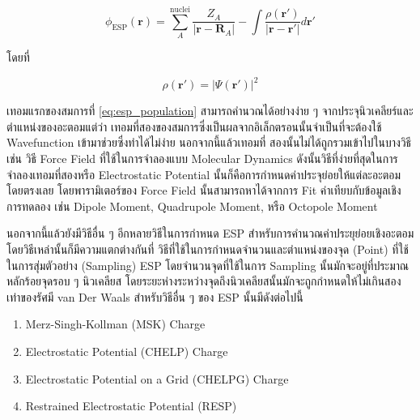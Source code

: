 \begin{enumerate}[topsep=0pt,noitemsep]
          \begin{equation}\label{eq:esp_population}
              \phi_{\text{ESP}}(\bm{r}) = \sum^{\text{nuclei}}_{A} \frac{Z_{A}}{|\bm{r} - \bm{R}_{A}|}
              - \int \frac{\rho(\bm{r}')}{|\bm{r} - \bm{r}'|} d\bm{r}'
          \end{equation}

          \noindent โดยที่

          \begin{equation}
              \rho(\bm{r}') = |\Psi(\bm{r}')|^{2}
          \end{equation}

          เทอมแรกของสมการที่ \eqref{eq:esp_population} สามารถคำนวณได้อย่างง่าย ๆ จากประจุนิวเคลียร์และตำแหน่งของอะตอมแต่ว่า%
          เทอมที่สองของสมการซึ่งเป็นผลจากอิเล็กตรอนนั้นจำเป็นที่จะต้องใช้ Wavefunction เข้ามาช่วยซึ่งทำได้ไม่ง่าย นอกจากนี้แล้วเทอมที่%
          สองนั้นไม่ได้ถูกรวมเข้าไปในบางวิธี เช่น วิธี Force Field ที่ใช้ในการจำลองแบบ Molecular Dynamics ดังนั้นวิธีที่ง่ายที่สุดในการ%
          จำลองเทอมที่สองหรือ Electrostatic Potential นั้นก็คือการกำหนดค่าประจุย่อยให้แต่ละอะตอมโดยตรงเลย โดยพารามิเตอร์ของ
          Force Field นั้นสามารถหาได้จากการ Fit ค่าเทียบกับข้อมูลเชิงการทดลอง เช่น Dipole Moment, Quadrupole Moment,
          หรือ Octopole Moment

          นอกจากนี้แล้วยังมีวิธีอื่น ๆ อีกหลายวิธีในการกำหนด ESP สำหรับการคำนวณค่าประยุย่อยเชิงอะตอม โดยวิธีเหล่านั้นก็มีความแตกต่างกันที่%
          วิธีที่ใช้ในการกำหนดจำนวนและตำแหน่งของจุด (Point) ที่ใช้ในการสุ่มตัวอย่าง (Sampling) ESP โดยจำนวนจุดที่ใช้ในการ Sampling
          นั้นมักจะอยู่ที่ประมาณหลักร้อยจุดรอบ ๆ นิวเคลียส โดยระยะห่างระหว่างจุดถึงนิวเคลียสนั้นมักจะถูกกำหนดให้ไม่เกินสองเท่าของรัศมี van
          Der Waals สำหรับวิธีอื่น ๆ ของ ESP นั้นมีดังต่อไปนี้

          \begin{enumerate}[topsep=0pt,noitemsep]\setlength\itemsep{0.5em}
              \item Merz-Singh-Kollman (MSK) Charge\autocite{singh1984}

              \item Electrostatic Potential (CHELP) Charge\autocite{chirlian1987}

              \item Electrostatic Potential on a Grid (CHELPG) Charge\autocite{breneman1990}

              \item Restrained Electrostatic Potential (RESP)\autocite{cornell1993}
          \end{enumerate}


\end{enumerate}
